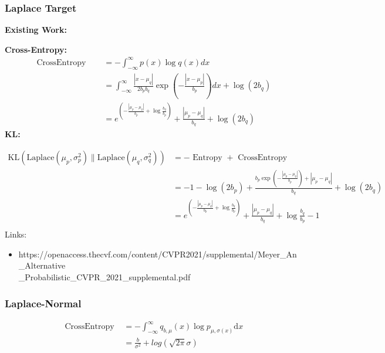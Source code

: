 \documentclass{article}
\begin{document}
\subsubsection{Laplace Target}

\noindent \textbf{Existing Work:}

\noindent \textbf{Cross-Entropy:}
$$ \begin{aligned} \text { CrossEntropy }
\quad &=-\int_{-\infty}^{\infty} p(x) \log q(x) d x \\
\quad &=\int_{-\infty}^{\infty} \frac{\left|x-\mu_{q}\right|}{2 b_{p} b_{q}} \exp \left(-\frac{\left|x-\mu_{p}\right|}{b_{p}}\right) d x+\log \left(2 b_{q}\right)\\&=e^{\left(-\frac{\left|\mu_{p}-\mu_{q}\right|}{b_{p}}+\log{\frac{b_{q}}{b_{p}}}\right)} +\frac{ \left|\mu_{p}-\mu_{q}\right|}{b_{q}}+\log \left(2 b_{q}\right)
\end{aligned}
 $$
\noindent \textbf{KL:}

$$ \begin{aligned}\mathrm{KL}\left(\mathrm{Laplace}\left(\mu_{p}, \sigma_{p}^{2}\right) \| \mathrm{Laplace}\left(\mu_{q}, \sigma_{q}^{2}\right)\right)&=-\text { Entropy }+\text{ CrossEntropy }\\&=-1-\log \left(2 b_{p}\right)+\frac{b_{p} \exp \left(-\frac{\left|\mu_{p}-\mu_{q}\right|}{b_{p}}\right)+\left|\mu_{p}-\mu_{q}\right|}{b_{q}}+\log \left(2 b_{q}\right)\\&=e^{\left(-\frac{\left|\mu_{p}-\mu_{q}\right|}{b_{p}}+\log{\frac{b_{q}}{b_{p}}}\right)} +\frac{ \left|\mu_{p}-\mu_{q}\right|}{b_{q}}+\log \frac{b_{q}}{b_{p}}-1\\
\end{aligned}
$$
Links:
\begin{itemize}
    \item  https://openaccess.thecvf.com/content/CVPR2021/supplemental/Meyer\_An\_Alternative\\\_Probabilistic\_CVPR\_2021\_supplemental.pdf
\end{itemize}


\subsubsection{Laplace-Normal}
$$ \begin{aligned} \text { CrossEntropy }&=
-\int_{-\infty}^{\infty} q_{b,\mu}(x) \log p_{\mu, \sigma(x)} \mathrm{d} x \\
&=\frac{b}{\sigma^{2}}+log(\sqrt{2\pi}\sigma) 
\end{aligned}
 $$
 
\end{document}
